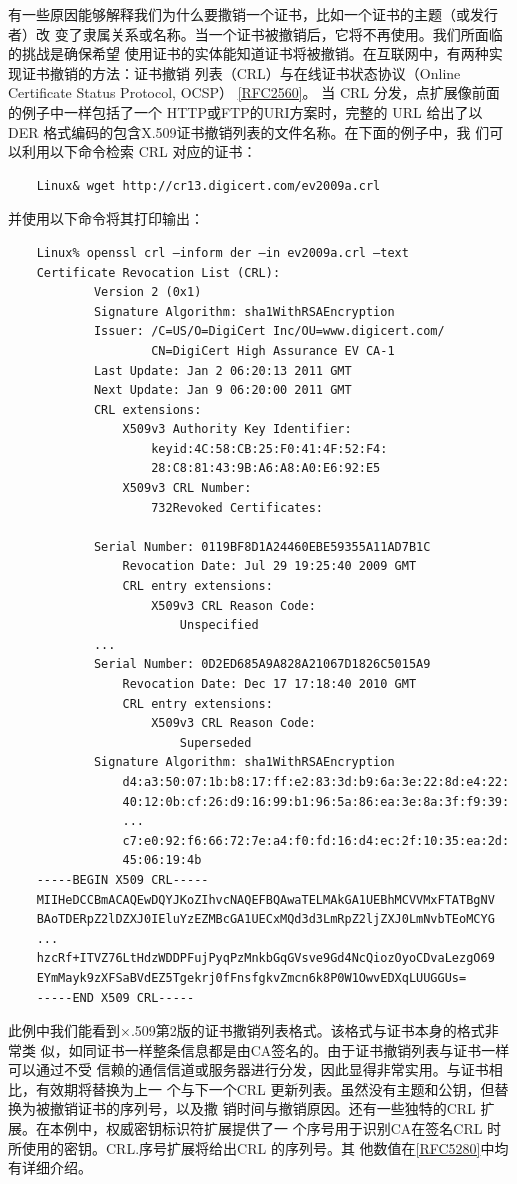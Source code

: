 有一些原因能够解释我们为什么要撒销一个证书，比如一个证书的主题（或发行者）改
变了隶属关系或名称。当一个证书被撤销后，它将不再使用。我们所面临的挑战是确保希望
使用证书的实体能知道证书将被撤销。在互联网中，有两种实现证书撤销的方法：证书撤销
列表（CRL）与在线证书状态协议（Online Certificate Status Protocol, OCSP） \href{https://www.rfc-editor.org/rfc/rfc2560}{[RFC2560]}。
当 CRL 分发，点扩展像前面的例子中一样包括了一个 HTTP或FTP的URI方案时，完整的
URL 给出了以 DER 格式编码的包含X.509证书撤销列表的文件名称。在下面的例子中，我
们可以利用以下命令检索 CRL 对应的证书：
\begin{verbatim}
    Linux& wget http://cr13.digicert.com/ev2009a.crl
\end{verbatim}
并使用以下命令将其打印输出：
\begin{verbatim}
    Linux% openssl crl –inform der –in ev2009a.crl –text
    Certificate Revocation List (CRL):
            Version 2 (0x1)
            Signature Algorithm: sha1WithRSAEncryption
            Issuer: /C=US/O=DigiCert Inc/OU=www.digicert.com/
                    CN=DigiCert High Assurance EV CA-1
            Last Update: Jan 2 06:20:13 2011 GMT
            Next Update: Jan 9 06:20:00 2011 GMT
            CRL extensions:
                X509v3 Authority Key Identifier:
                    keyid:4C:58:CB:25:F0:41:4F:52:F4:
                    28:C8:81:43:9B:A6:A8:A0:E6:92:E5
                X509v3 CRL Number:
                    732Revoked Certificates:

            Serial Number: 0119BF8D1A24460EBE59355A11AD7B1C
                Revocation Date: Jul 29 19:25:40 2009 GMT
                CRL entry extensions:
                    X509v3 CRL Reason Code:
                        Unspecified
            ...
            Serial Number: 0D2ED685A9A828A21067D1826C5015A9
                Revocation Date: Dec 17 17:18:40 2010 GMT
                CRL entry extensions:
                    X509v3 CRL Reason Code:
                        Superseded
            Signature Algorithm: sha1WithRSAEncryption
                d4:a3:50:07:1b:b8:17:ff:e2:83:3d:b9:6a:3e:22:8d:e4:22:
                40:12:0b:cf:26:d9:16:99:b1:96:5a:86:ea:3e:8a:3f:f9:39:
                ...
                c7:e0:92:f6:66:72:7e:a4:f0:fd:16:d4:ec:2f:10:35:ea:2d:
                45:06:19:4b
    -----BEGIN X509 CRL-----
    MIIHeDCCBmACAQEwDQYJKoZIhvcNAQEFBQAwaTELMAkGA1UEBhMCVVMxFTATBgNV
    BAoTDERpZ2lDZXJ0IEluYzEZMBcGA1UECxMQd3d3LmRpZ2ljZXJ0LmNvbTEoMCYG
    ...
    hzcRf+ITVZ76LtHdzWDDPFujPyqPzMnkbGqGVsve9Gd4NcQiozOyoCDvaLezgO69
    EYmMayk9zXFSaBVdEZ5Tgekrj0fFnsfgkvZmcn6k8P0W1OwvEDXqLUUGGUs=
    -----END X509 CRL-----
\end{verbatim}
此例中我们能看到×.509第2版的证书撒销列表格式。该格式与证书本身的格式非常类
似，如同证书一样整条信息都是由CA签名的。由于证书撤销列表与证书一样可以通过不受
信赖的通信信道或服务器进行分发，因此显得非常实用。与证书相比，有效期将替换为上一
个与下一个CRL 更新列表。虽然没有主题和公钥，但替换为被撤销证书的序列号，以及撒
销时间与撤销原因。还有一些独特的CRL 扩展。在本例中，权威密钥标识符扩展提供了一
个序号用于识别CA在签名CRL 时所使用的密钥。CRL.序号扩展将给出CRL 的序列号。其
他数值在\href{https://www.rfc-editor.org/rfc/rfc5280}{[RFC5280]}中均有详细介绍。

